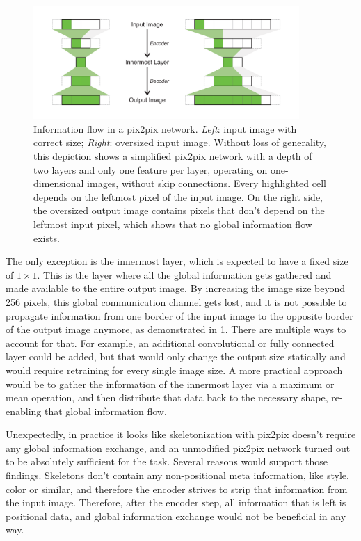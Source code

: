 \begin{figure}
  \centering
  \includegraphics[width=0.9\textwidth]{../assets/pix2pixScaling.pdf}
  \caption[Information flow in a pix2pix network]{Information flow in a \gls{pix2pix} network. \emph{Left}: input image with correct size; \emph{Right}: oversized input image. Without loss of generality, this depiction shows a simplified \gls{pix2pix} network with a depth of two layers and only one feature per layer, operating on one-dimensional images, without skip connections. Every highlighted cell depends on the leftmost pixel of the input image. On the right side, the oversized output image contains pixels that don't depend on the leftmost input pixel, which shows that no global information flow exists.}
  \label{pix2pixScaling}
\end{figure}

The only exception is the innermost layer, which is expected to have a fixed size of $1\times1$. This is the layer where all the global information gets gathered and made available to the entire output image.
By increasing the image size beyond 256 pixels, this global communication channel gets lost, and it is not possible to propagate information from one border of the input image to the opposite border of the output image anymore, as demonstrated in \cref{pix2pixScaling}. There are multiple ways to account for that. For example, an additional convolutional or fully connected layer could be added, but that would only change the output size statically and would require retraining for every single image size. A more practical approach would be to gather the information of the innermost layer via a maximum or mean operation, and then distribute that data back to the necessary shape, re-enabling that global information flow.

Unexpectedly, in practice it looks like skeletonization with \gls{pix2pix} doesn't require any global information exchange, and an unmodified \gls{pix2pix} network turned out to be absolutely sufficient for the task. Several reasons would support those findings. Skeletons don't contain any non-positional meta information, like style, color or similar, and therefore the encoder strives to strip that information from the input image. Therefore, after the encoder step, all information that is left is positional data, and global information exchange would not be beneficial in any way.

